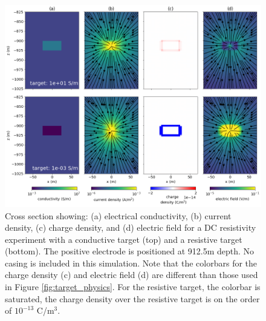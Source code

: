 \begin{figure}
    \begin{center}
    \includegraphics[width=\textwidth]{figures/dc_casing/uncased_target_physics.png}
    \end{center}
\caption{
    Cross section showing: (a) electrical conductivity, (b) current density, (c) charge density, and
    (d) electric field for a DC resistivity experiment with a conductive target (top) and a resistive target
    (bottom). The positive electrode is positioned at 912.5m depth.
    No casing is included in this simulation. Note that the colorbars for the charge density (c) and electric field (d)
    are different than those used in Figure \ref{fig:target_physics}. For the resistive target, the colorbar is saturated,
    the charge density over the resistive target is on the order of $10^{-13}$ C/m$^3$.
}
\label{fig:uncased_target_physics}
\end{figure}
